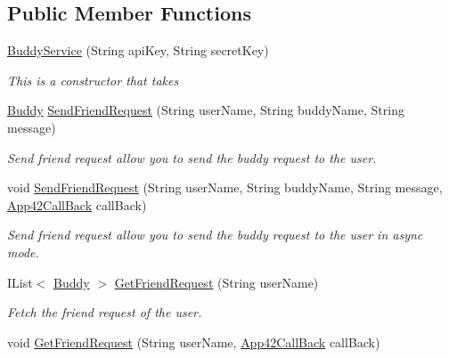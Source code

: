\subsection*{Public Member Functions}
\begin{DoxyCompactItemize}
\item 
\hyperlink{classcom_1_1shephertz_1_1app42_1_1paas_1_1sdk_1_1csharp_1_1buddy_1_1_buddy_service_a3e08dbc011dd0579847bf354bfb13458}{Buddy\+Service} (String api\+Key, String secret\+Key)
\begin{DoxyCompactList}\small\item\em This is a constructor that takes \end{DoxyCompactList}\item 
\hyperlink{classcom_1_1shephertz_1_1app42_1_1paas_1_1sdk_1_1csharp_1_1buddy_1_1_buddy}{Buddy} \hyperlink{classcom_1_1shephertz_1_1app42_1_1paas_1_1sdk_1_1csharp_1_1buddy_1_1_buddy_service_a6e664761a1e75091be06d82e32973071}{Send\+Friend\+Request} (String user\+Name, String buddy\+Name, String message)
\begin{DoxyCompactList}\small\item\em Send friend request allow you to send the buddy request to the user. \end{DoxyCompactList}\item 
void \hyperlink{classcom_1_1shephertz_1_1app42_1_1paas_1_1sdk_1_1csharp_1_1buddy_1_1_buddy_service_a8a4602596db2801529205ba19751b062}{Send\+Friend\+Request} (String user\+Name, String buddy\+Name, String message, \hyperlink{interfacecom_1_1shephertz_1_1app42_1_1paas_1_1sdk_1_1csharp_1_1_app42_call_back}{App42\+Call\+Back} call\+Back)
\begin{DoxyCompactList}\small\item\em Send friend request allow you to send the buddy request to the user in async mode. \end{DoxyCompactList}\item 
I\+List$<$ \hyperlink{classcom_1_1shephertz_1_1app42_1_1paas_1_1sdk_1_1csharp_1_1buddy_1_1_buddy}{Buddy} $>$ \hyperlink{classcom_1_1shephertz_1_1app42_1_1paas_1_1sdk_1_1csharp_1_1buddy_1_1_buddy_service_a01b63bc32b9ddb188b17bae4ecba36e5}{Get\+Friend\+Request} (String user\+Name)
\begin{DoxyCompactList}\small\item\em Fetch the friend request of the user. \end{DoxyCompactList}\item 
void \hyperlink{classcom_1_1shephertz_1_1app42_1_1paas_1_1sdk_1_1csharp_1_1buddy_1_1_buddy_service_aef6f7e3f557ed27ca720ed6a9ec1fb51}{Get\+Friend\+Request} (String user\+Name, \hyperlink{interfacecom_1_1shephertz_1_1app42_1_1paas_1_1sdk_1_1csharp_1_1_app42_call_back}{App42\+Call\+Back} call\+Back)

\end{DoxyCompactItemize}
